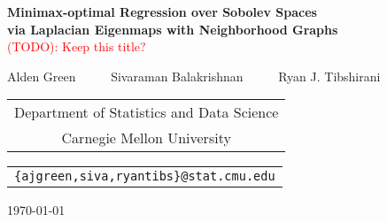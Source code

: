 \documentclass{article}
\theoremstyle{definition}
\newcommand{\1}{\mathbf{1}}
\begin{document}
	
\begin{center} {\Large{\bf{Minimax-optimal Regression over Sobolev Spaces \\
				\vspace{.2cm}
				via Laplacian Eigenmaps with Neighborhood Graphs} \\}
			\textcolor{red}{(TODO): Keep this title?}}
	
	\vspace*{.3cm}
	
	{\large{
			\begin{center}
				Alden Green~~~~~ Sivaraman Balakrishnan~~~~~ Ryan J. Tibshirani\\
				\vspace{.2cm}
			\end{center}
			
			
			\begin{tabular}{c}
				Department of Statistics and Data Science \\
				Carnegie Mellon University
			\end{tabular}
			
			\vspace*{.2in}
			
			\begin{tabular}{c}
				\texttt{\{ajgreen,siva,ryantibs\}@stat.cmu.edu}
			\end{tabular}
	}}
	
	\vspace*{.2in}
	
	\today
	\vspace*{.2in}
\end{center}
\end{document}

